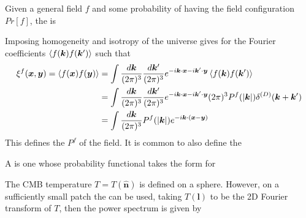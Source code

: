 \documentclass{article}
\begin{document}
\begin{definition}
Given a general field $f$ and some probability of having the field configuration $Pr[f]$, the  is 
\end{definition}

\begin{lemma}
Imposing homogeneity and isotropy of the universe gives 
for the Fourier coefficients $\braket{f(\bm{k})f(\bm{k}^\prime)}$ such that 
\begin{align}\label{eq:CSM:15}
 \xi^f(\bm{x},\bm{y}) = \braket{f(\bm{x})f(\bm{y})} &= \int \frac{d\bm{k}}{(2\pi)^3} \frac{d\bm{k}^\prime}{(2\pi)^3} e^{-i\bm{k}\cdot\bm{x} -i \bm{k}^\prime \cdot \bm{y}} \braket{f(\bm{k})f(\bm{k}^\prime)} \\
 &=\int \frac{d\bm{k}}{(2\pi)^3} \frac{d\bm{k}^\prime}{(2\pi)^3} e^{-i\bm{k}\cdot\bm{x} -i \bm{k}^\prime \cdot \bm{y}}  (2\pi)^3 P^f(|\bm{k}|) \delta^{(D)}(\bm{k} + \bm{k}^\prime) \\
 &= \int \frac{d\bm{k}}{(2\pi)^3} P^f(|\bm{k}|) e^{-i\bm{k} \cdot (\bm{x} - \bm{y})}
\end{align}
This defines the  $P^f$ of the field. It is common to also define the  
\end{lemma}

\begin{definition}
A  is one whose probability functional takes the form 
for 
\end{definition}

\begin{definition}
The CMB temperature $T=T(\hat{\bm{n}})$ is defined on a sphere. However, on a sufficiently small patch the  can be used, taking $T(\bm{l})$ to be the 2D Fourier transform of $T$, then the power spectrum is given by 
\end{definition}

\end{document}
